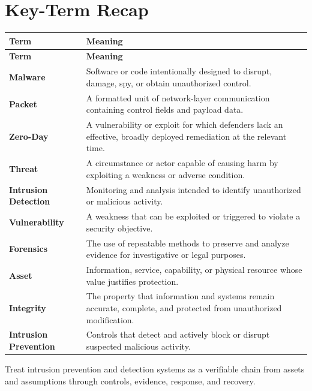 \documentclass[11pt]{article}
\begin{document}
\section*{Key-Term Recap}
\begin{longtable}{>{\RaggedRight\arraybackslash}p{}>{\RaggedRight\arraybackslash}p{}}
\toprule\rowcolor{Navy}\color{white}\textbf{Term} & \color{white}\textbf{Meaning}\\\midrule
\endfirsthead
\toprule\rowcolor{Navy}\color{white}\textbf{Term} & \color{white}\textbf{Meaning}\\\midrule
\endhead
\textbf{Malware} & Software or code intentionally designed to disrupt, damage, spy, or obtain unauthorized control. \\\midrule
\textbf{Packet} & A formatted unit of network-layer communication containing control fields and payload data. \\\midrule
\textbf{Zero-Day} & A vulnerability or exploit for which defenders lack an effective, broadly deployed remediation at the relevant time. \\\midrule
\textbf{Threat} & A circumstance or actor capable of causing harm by exploiting a weakness or adverse condition. \\\midrule
\textbf{Intrusion Detection} & Monitoring and analysis intended to identify unauthorized or malicious activity. \\\midrule
\textbf{Vulnerability} & A weakness that can be exploited or triggered to violate a security objective. \\\midrule
\textbf{Forensics} & The use of repeatable methods to preserve and analyze evidence for investigative or legal purposes. \\\midrule
\textbf{Asset} & Information, service, capability, or physical resource whose value justifies protection. \\\midrule
\textbf{Integrity} & The property that information and systems remain accurate, complete, and protected from unauthorized modification. \\\midrule
\textbf{Intrusion Prevention} & Controls that detect and actively block or disrupt suspected malicious activity. \\\midrule
\bottomrule
\end{longtable}
\begin{takeawaybox}
Treat intrusion prevention and detection systems as a verifiable chain from assets and assumptions through controls, evidence, response, and recovery.
\end{takeawaybox}
\end{document}
